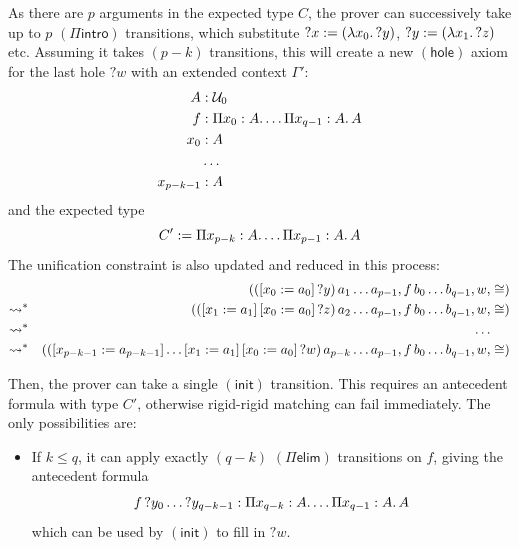 \documentclass[twoside]{report}
\begin{document}
\begin{example}
    As there are $p$ arguments in the expected type $C$, the prover can successively take up to $p$ $(\Pi\mathsf{intro})$ transitions, which substitute ${?x} := (\lambda{x_0}.\,{?y})$, ${?y} := (\lambda{x_1}.\,{?z})$ etc. Assuming it takes $(p - k)$ transitions, this will create a new $(\mathsf{hole})$ axiom for the last hole ${?w}$ with an extended context $\Gamma'$:
    $$
        \begin{aligned}
            A         & : \mathcal U_0                             \\
            f         & : \Pi{x_0} : {A}.\,{\ldots \Pi{x_{q-1}} : {A}.\,{A}} \\
            x_0       & : A                                        \\
                      & \ldots                                     \\
            x_{p-k-1} & : A                                        \\
        \end{aligned}
    $$
    and the expected type
    $$
        C' := \Pi{x_{p-k}} : {A}.\,{\ldots \Pi{x_{p-1}} : {A}.\,{A}}
    $$
    The unification constraint is also updated and reduced in this process:
    $$
        \begin{aligned}
                                  &  & ({{{([{x_0}:={a_0}]\,{?}y)}\,{a_1}}\,{\ldots}}\,{a_{p-1}}, {{{f}\,{b_0}}\,{\ldots}}\,{b_{q-1}}, w,                                                                & \cong) \\
            \rightsquigarrow^\ast &  & ({{{([{x_1}:={a_1}]\,{[{x_0}:={a_0}]\,{?}z})}\,{a_2}}\,{\ldots}}\,{a_{p-1}}, {{{f}\,{b_0}}\,{\ldots}}\,{b_{q-1}}, w,                                            & \cong) \\
            \rightsquigarrow^\ast &  & \ldots                                                                                                                                                                                           \\
            \rightsquigarrow^\ast &  & ({{{([{x_{p-k-1}}:={a_{p-k-1}}]\,{\ldots [{x_1}:={a_1}]\,{[{x_0}:={a_0}]\,{?}w}})}\,{a_{p-k}}}\,{\ldots}}\,{a_{p-1}}, {{{f}\,{b_0}}\,{\ldots}}\,{b_{q-1}}, w, & \cong) \\
        \end{aligned}
    $$

    Then, the prover can take a single $(\mathsf{init})$ transition. This requires an antecedent formula with type $C'$, otherwise rigid-rigid matching can fail immediately. The only possibilities are:
    \begin{itemize}
        \item If $k \leq q$, it can apply exactly $(q - k)$ $(\Pi\mathsf{elim})$ transitions on $f$, giving the antecedent formula
              $$
                  {{{f}\,{?y_0}}\,{\ldots}}\,{?y_{q-k-1}} : \Pi{x_{q-k}} : {A}.\,{\ldots \Pi{x_{q-1}} : {A}.\,{A}}
              $$
              which can be used by $(\mathsf{init})$ to fill in ${?w}$.


\end{itemize}
\end{example}
\end{document}
